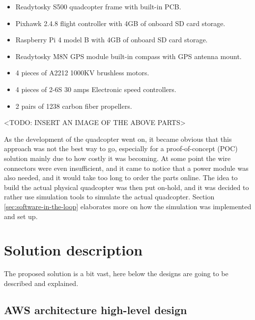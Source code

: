 \begin{itemize}
    \item Readytosky S500 quadcopter frame with built-in PCB.
    \item Pixhawk 2.4.8 flight controller with 4GB of onboard SD card storage.
    \item Raspberry Pi 4 model B with 4GB of onboard SD card storage.
    \item Readytosky M8N GPS module built-in compass with GPS antenna mount.
    \item 4 pieces of A2212 1000KV brushless motors.
    \item 4 pieces of 2-6S 30 amps Electronic speed controllers.
    \item 2 pairs of 1238 carbon fiber propellers.
\end{itemize}

<TODO: INSERT AN IMAGE OF THE ABOVE PARTS>

As the development of the quadcopter went on, it became obvious that this approach was not the best way to go, especially for a proof-of-concept (POC) solution mainly due to how costly it was becoming. At some point the wire connectors were even insufficient, and it came to notice that a power module was also needed, and it would take too long to order the parts online. The idea to build the actual physical quadcopter was then put on-hold, and it was decided to rather use simulation tools to simulate the actual quadcopter. Section \ref{sec:software-in-the-loop} elaborates more on how the simulation was implemented and set up.




\section{Solution description}
\label{solution-description}

The proposed solution is a bit vast, here below the designs are going to be described and explained.

\subsection{AWS architecture high-level design}
\label{subsec:aws-architecture-hld}

